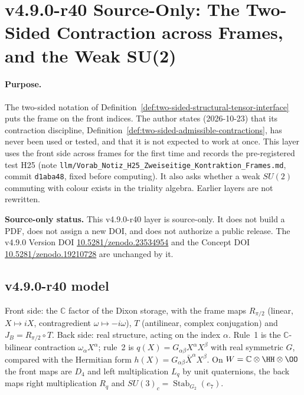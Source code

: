 \clearpage
\section*{v4.9.0-r40 Source-Only: The Two-Sided Contraction across Frames, and the Weak SU(2)}
\label{sec:v490-r40-two-sided-frames}

\paragraph{Purpose.}
The two-sided notation of Definition~\ref{def:two-sided-structural-tensor-interface} puts the frame on the front indices.  The author
states (2026-10-23) that its contraction discipline, Definition~\ref{def:two-sided-admissible-contractions}, has never been used or
tested, and that it is not expected to work at once.  This layer uses the front side across frames for the first time and records
the pre-registered test H25 (note \texttt{llm/Vorab\_Notiz\_H25\_Zweiseitige\_Kontraktion\_Frames.md}, commit \texttt{d1aba48}, fixed
before computing).  It also asks whether a weak \(SU(2)\) commuting with colour exists in the triality algebra.  Earlier layers are not
rewritten.

\noindent\textbf{Source-only status.}
This v4.9.0-r40 layer is source-only.  It does not build a PDF, does not assign a new DOI,
and does not authorize a public release.  The v4.9.0 Version DOI
\href{https://doi.org/10.5281/zenodo.23534954}{10.5281/zenodo.23534954} and the Concept DOI
\href{https://doi.org/10.5281/zenodo.19210728}{10.5281/zenodo.19210728} are unchanged by it.

\subsection*{v4.9.0-r40 model}
\label{subsec:v490-r40-model}

Front side: the \(\mathbb C\) factor of the Dixon storage, with the frame maps \(R_{\pi/2}\) (linear, \(X\mapsto iX\), contragredient
\(\omega\mapsto-i\omega\)), \(T\) (antilinear, complex conjugation) and \(J_B=R_{\pi/2}\circ T\).  Back side: real structure, acting on
the index \(\alpha\).  Rule~1 is the \(\mathbb C\)-bilinear contraction \(\omega_\alpha X^\alpha\); rule~2 is \(q(X)=G_{\alpha\beta}X^\alpha X^\beta\)
with real symmetric \(G\), compared with the Hermitian form \(h(X)=G_{\alpha\beta}\bar X^\alpha X^\beta\).  On
\(W=\mathbb C\otimes\HH\otimes\OO\) the front maps are \(D_4\) and left multiplication \(L_q\) by unit quaternions, the back maps right
multiplication \(R_q\) and \(SU(3)_c=\operatorname{Stab}_{G_2}(e_7)\).

